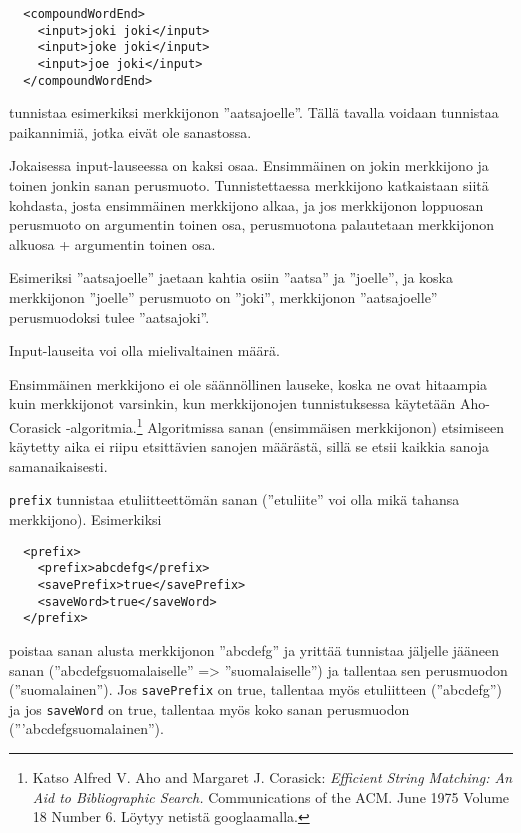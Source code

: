 \documentclass[12pt]{article}
\begin{document}
\begin{verbatim}
  <compoundWordEnd>
    <input>joki joki</input>
    <input>joke joki</input>
    <input>joe joki</input>
  </compoundWordEnd>
\end{verbatim}

tunnistaa esimerkiksi merkkijonon ''aatsajoelle''. Tällä tavalla
voidaan tunnistaa paikannimiä, jotka eivät ole sanastossa.

Jokaisessa input-lauseessa on kaksi osaa. Ensimmäinen on jokin
merkkijono ja toinen jonkin sanan perusmuoto. Tunnistettaessa
merkkijono katkaistaan siitä kohdasta, josta ensimmäinen merkkijono
alkaa, ja jos merkkijonon loppuosan perusmuoto on argumentin toinen
osa, perusmuotona palautetaan merkkijonon alkuosa + argumentin toinen
osa.

Esimeriksi ''aatsajoelle'' jaetaan kahtia osiin ''aatsa'' ja
''joelle'', ja koska merkkijonon ''joelle'' perusmuoto on ''joki'',
merkkijonon ''aatsajoelle'' perusmuodoksi tulee ''aatsajoki''.

Input-lauseita voi olla mielivaltainen määrä.

Ensimmäinen merkkijono ei ole säännöllinen lauseke, koska ne ovat
hitaampia kuin merkkijonot varsinkin, kun merkkijonojen tunnistuksessa
käytetään Aho-Corasick -algoritmia.\footnote{Katso
Alfred V. Aho and Margaret J. Corasick:
\emph{Efficient String Matching: An Aid to Bibliographic Search.}
Communications of the ACM. June 1975 Volume 18 Number 6.
Löytyy netistä googlaamalla.} Algoritmissa sanan (ensimmäisen
merkkijonon) etsimiseen käytetty aika ei riipu etsittävien sanojen
määrästä, sillä se etsii kaikkia sanoja samanaikaisesti.



\bigskip
\verb|prefix| tunnistaa etuliitteettömän sanan (''etuliite'' voi olla
mikä tahansa merkkijono). Esimerkiksi

\begin{verbatim}
  <prefix>
    <prefix>abcdefg</prefix>
    <savePrefix>true</savePrefix>
    <saveWord>true</saveWord>
  </prefix>
\end{verbatim}

poistaa sanan alusta merkkijonon ''abcdefg'' ja yrittää tunnistaa
jäljelle jääneen sanan (''abcdefgsuomalaiselle'' => ''suomalaiselle'')
ja tallentaa sen perusmuodon (''suomalainen''). Jos \verb|savePrefix|
on true, tallentaa myös etuliitteen (''abcdefg'') ja jos
\verb|saveWord| on true, tallentaa myös koko sanan perusmuodon
('''abcdefgsuomalainen'').
\end{document}

